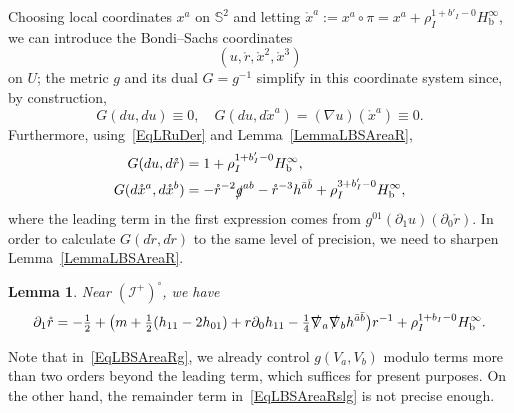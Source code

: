 \documentclass[reqno,11pt,letterpaper]{amsart}
\numberwithin{equation}{section}
\numberwithin{figure}{section}
\newtheorem{lemma}[thm]{Lemma}
\theoremstyle{definition}
\theoremstyle{remark}
\newcommand{\ms}{\mathscr}
\newcommand{\scri}{\ms I}
\newcommand{\Sph}{\mathbb{S}}
\newcommand{\slg}{\slashed{g}{}}
\newcommand{\slnabla}{\slashed{\nabla}{}}
\newcommand{\pa}{\partial}
\newcommand{\bop}{{\mathrm{b}}}
\newcommand{\half}{\tfrac{1}{2}}
\newcommand{\Hb}{H_{\bop}}
\begin{document}
Choosing local coordinates $x^a$ on $\Sph^2$ and letting $\mathring x^a:=x^a\circ\pi=x^a+\rho_I^{1+b'_I-0}\Hb^\infty$, we can introduce the Bondi--Sachs coordinates
\begin{equation}
\label{EqLBSCoord}
  (u,\mathring r,\mathring x^2,\mathring x^3)
\end{equation}
on $U$; the metric $g$ and its dual $G=g^{-1}$ simplify in this coordinate system since, by construction,
\begin{equation}
\label{EqLBSg1}
  G(d u,d u)\equiv 0, \quad
  G(d u,d\mathring x^a)=(\nabla u)(\mathring x^a)\equiv 0.
\end{equation}
Furthermore, using~\eqref{EqLRuDer} and Lemma~\ref{LemmaLBSAreaR},
\begin{equation}
\label{EqLBSg2}
\begin{split}
  G(d u,d\mathring r) &= 1 + \rho_I^{1+b'_I-0}\Hb^\infty, \\
  G(d\mathring x^a,d\mathring x^b) &= -\mathring r^{-2}\slg^{a b}-\mathring r^{-3}h^{\bar a\bar b} + \rho_I^{3+b'_I-0}\Hb^\infty,
\end{split}
\end{equation}
where the leading term in the first expression comes from $g^{0 1}(\pa_1 u)(\pa_0\mathring r)$. In order to calculate $G(d\mathring r,d\mathring r)$ to the same level of precision, we need to sharpen Lemma~\ref{LemmaLBSAreaR}.

\begin{lemma}
\label{LemmaLBSAreaRder}
  Near $(\scri^+)^\circ$, we have
  \[
    \pa_1\mathring r=-\half+\bigl(m+\half(h_{1 1}-2 h_{0 1})+r\pa_0 h_{1 1}-\tfrac14\slnabla_a\slnabla_b h^{\bar a\bar b}\bigr)r^{-1}+\rho_I^{1+b_I-0}\Hb^\infty.
  \]
\end{lemma}

Note that in~\eqref{EqLBSAreaRg}, we already control $g(V_a,V_b)$ modulo terms more than two orders beyond the leading term, which suffices for present purposes. On the other hand, the remainder term in~\eqref{EqLBSAreaRslg} is not precise enough. 
\end{document}
